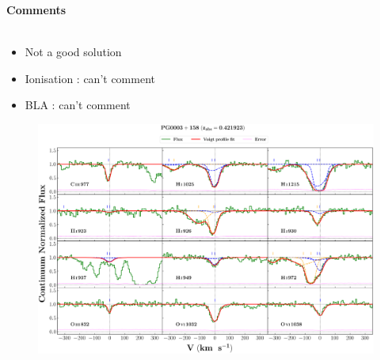 \documentclass[12pt]{report}
\begin{document}
\newpage

\textbf{Comments}
\\\\
\begin{itemize}
    \item Not a good solution
    \item Ionisation : can't comment
    \item BLA : can't comment
\end{itemize}



\newpage


\begin{landscape}

    \begin{figure}
    \centering
    \vspace{-20mm}
    \hspace*{-35mm}
    \includegraphics[width=1.25\linewidth]{System-Plots/PG0003+158_z=0.421923_sys_plot.png}
    \end{figure}
    
\end{landscape}
\end{document}
